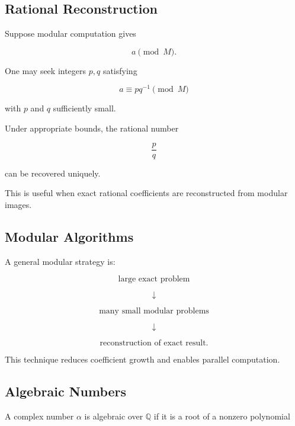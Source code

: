 \subsection{Rational Reconstruction}
\label{subsec:rational-reconstruction}

Suppose modular computation gives

\[
a
\pmod M.
\]

One may seek integers \(p,q\) satisfying

\[
\boxed{
a
\equiv
pq^{-1}
\pmod M
}
\]

with \(p\) and \(q\) sufficiently small.

Under appropriate bounds, the rational number

\[
\boxed{
\frac pq
}
\]

can be recovered uniquely.

This is useful when exact rational coefficients are reconstructed from
modular images.

\subsection{Modular Algorithms}
\label{subsec:modular-algorithms}

A general modular strategy is:

\[
\boxed{
\text{large exact problem}
}
\]

\[
\downarrow
\]

\[
\boxed{
\text{many small modular problems}
}
\]

\[
\downarrow
\]

\[
\boxed{
\text{reconstruction of exact result}.
}
\]

This technique reduces coefficient growth and enables parallel
computation.

\subsection{Algebraic Numbers}
\label{subsec:computer-algebra-algebraic-numbers}

A complex number \(\alpha\) is algebraic over \(\mathbb{Q}\) if it is a
root of a nonzero polynomial

